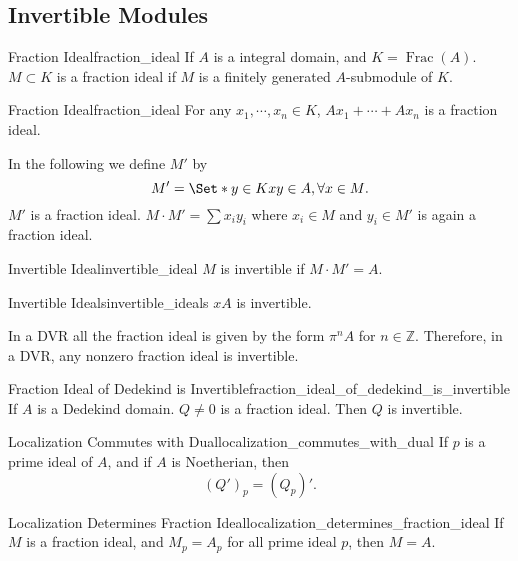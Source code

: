 \documentclass{article}
\begin{document}
\subsection{Invertible Modules}

\begin{definition}{Fraction Ideal}{fraction_ideal}
    If $A$ is a integral domain, and $K = \operatorname{Frac}(A)$.
    $M\subset K$ is a fraction ideal if $M$ is a finitely generated $A$-submodule of $K$.
\end{definition}

\begin{example}{Fraction Ideal}{fraction_ideal}
    For any $x_1,\cdots,x_n\in K$, $Ax_1 + \cdots + Ax_n$ is a fraction ideal.
\end{example}

In the following we define $M'$ by
\[ M' = \Set*{y\in K}{xy\in A,\forall x\in M}. \]
$M'$ is a fraction ideal.
$M\cdot M' = \sum x_i y_i$ where $x_i\in M$ and $y_i\in M'$ is again a fraction ideal.

\begin{definition}{Invertible Ideal}{invertible_ideal}
    $M$ is invertible if $M\cdot M' = A$.
\end{definition}

\begin{example}{Invertible Ideals}{invertible_ideals}
    $xA$ is invertible.
\end{example}

In a DVR all the fraction ideal is given by the form $\pi^n A$ for $n\in \mathbb{Z}$.
Therefore, in a DVR, any nonzero fraction ideal is invertible.

\begin{proposition}{Fraction Ideal of Dedekind is Invertible}{fraction_ideal_of_dedekind_is_invertible}
    If $A$ is a Dedekind domain.
    $Q\neq 0$ is a fraction ideal.
    Then $Q$ is invertible.
\end{proposition}

\begin{lemma}{Localization Commutes with Dual}{localization_commutes_with_dual}
    If $p$ is a prime ideal of $A$, and if $A$ is Noetherian, then
    \[ (Q')_p = (Q_p)'. \]
\end{lemma}

\begin{lemma}{Localization Determines Fraction Ideal}{localization_determines_fraction_ideal}
    If $M$ is a fraction ideal, and $M_p = A_p$ for all prime ideal $p$, then $M=A$.
\end{lemma}
\end{document}
